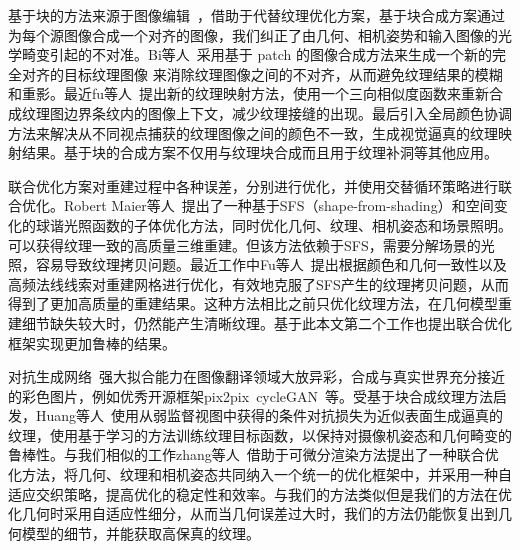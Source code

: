 \vspace*{2mm}基于块的方法来源于图像编辑~\cite{Barnes:2009:PAR}，借助于代替纹理优化方案，基于块合成方案通过为每个源图像合成一个对齐的图像，我们纠正了由几何、相机姿势和输入图像的光学畸变引起的不对准。Bi等人~\cite{bi2017patch}采用基于 patch 的图像合成方法来生成一个新的完全对齐的目标纹理图像 来消除纹理图像之间的不对齐，从而避免纹理结果的模糊和重影。最近fu等人~\cite{fu2021seamless}提出新的纹理映射方法，使用一个三向相似度函数来重新合成纹理图边界条纹内的图像上下文，减少纹理接缝的出现。最后引入全局颜色协调方法来解决从不同视点捕获的纹理图像之间的颜色不一致，生成视觉逼真的纹理映射结果。基于块的合成方案不仅用与纹理块合成而且用于纹理补洞等其他应用。\par
\vspace*{2mm}联合优化方案对重建过程中各种误差，分别进行优化，并使用交替循环策略进行联合优化。Robert Maier等人~\cite{RobertMaier2017Intrinsic3DH3}提出了一种基于SFS（shape-from-shading）和空间变化的球谐光照函数的子体优化方法，同时优化几何、纹理、相机姿态和场景照明。可以获得纹理一致的高质量三维重建。但该方法依赖于SFS，需要分解场景的光照，容易导致纹理拷贝问题。最近工作中Fu等人~\cite{YanpingFu2020JointTA}提出根据颜色和几何一致性以及高频法线线索对重建网格进行优化，有效地克服了SFS产生的纹理拷贝问题，从而得到了更加高质量的重建结果。这种方法相比之前只优化纹理方法，在几何模型重建细节缺失较大时，仍然能产生清晰纹理。基于此本文第二个工作也提出联合优化框架实现更加鲁棒的结果。\par
\vspace*{2mm}对抗生成网络~\cite{NIPS2014_5ca3e9b1}强大拟合能力在图像翻译领域大放异彩，合成与真实世界充分接近的彩色图片，例如优秀开源框架pix2pix~\cite{isola2017image}cycleGAN~\cite{  zhu2017unpaired}等。受基于块合成纹理方法启发，Huang等人~\cite{JingweiHuang2020AdversarialTO}使用从弱监督视图中获得的条件对抗损失为近似表面生成逼真的纹理，使用基于学习的方法训练纹理目标函数，以保持对摄像机姿态和几何畸变的鲁棒性。与我们相似的工作zhang等人~\cite{9705143}借助于可微分渲染方法提出了一种联合优化方法，将几何、纹理和相机姿态共同纳入一个统一的优化框架中，并采用一种自适应交织策略，提高优化的稳定性和效率。与我们的方法类似但是我们的方法在优化几何时采用自适应性细分，从而当几何误差过大时，我们的方法仍能恢复出到几何模型的细节，并能获取高保真的纹理。
